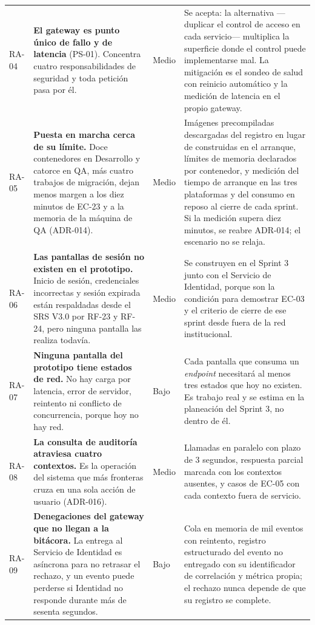\documentclass[11pt,a4paper]{article}
\begin{document}
\begin{longtable}{L{1.2cm} L{4.6cm} L{1.5cm} L{6.9cm}}
RA-04 & \textbf{El gateway es punto único de fallo y de latencia} (PS-01). Concentra cuatro responsabilidades de seguridad y toda petición pasa por él. & Medio & Se acepta: la alternativa ---duplicar el control de acceso en cada servicio--- multiplica la superficie donde el control puede implementarse mal. La mitigación es el sondeo de salud con reinicio automático y la medición de latencia en el propio gateway. \\
RA-05 & \textbf{Puesta en marcha cerca de su límite.} Doce contenedores en Desarrollo y catorce en QA, más cuatro trabajos de migración, dejan menos margen a los diez minutos de EC-23 y a la memoria de la máquina de QA (ADR-014). & Medio & Imágenes precompiladas descargadas del registro en lugar de construidas en el arranque, límites de memoria declarados por contenedor, y medición del tiempo de arranque en las tres plataformas y del consumo en reposo al cierre de cada sprint. Si la medición supera diez minutos, se reabre ADR-014; el escenario no se relaja. \\
RA-06 & \textbf{Las pantallas de sesión no existen en el prototipo.} Inicio de sesión, credenciales incorrectas y sesión expirada están respaldadas desde el SRS V3.0 por RF-23 y RF-24, pero ninguna pantalla las realiza todavía. & Medio & Se construyen en el Sprint 3 junto con el Servicio de Identidad, porque son la condición para demostrar EC-03 y el criterio de cierre de ese sprint desde fuera de la red institucional. \\
RA-07 & \textbf{Ninguna pantalla del prototipo tiene estados de red.} No hay carga por latencia, error de servidor, reintento ni conflicto de concurrencia, porque hoy no hay red. & Bajo & Cada pantalla que consuma un \emph{endpoint} necesitará al menos tres estados que hoy no existen. Es trabajo real y se estima en la planeación del Sprint 3, no dentro de él. \\
RA-08 & \textbf{La consulta de auditoría atraviesa cuatro contextos.} Es la operación del sistema que más fronteras cruza en una sola acción de usuario (ADR-016). & Medio & Llamadas en paralelo con plazo de 3 segundos, respuesta parcial marcada con los contextos ausentes, y casos de EC-05 con cada contexto fuera de servicio. \\
RA-09 & \textbf{Denegaciones del gateway que no llegan a la bitácora.} La entrega al Servicio de Identidad es asíncrona para no retrasar el rechazo, y un evento puede perderse si Identidad no responde durante más de sesenta segundos. & Bajo & Cola en memoria de mil eventos con reintento, registro estructurado del evento no entregado con su identificador de correlación y métrica propia; el rechazo nunca depende de que su registro se complete. \\
\end{longtable}
\end{document}
